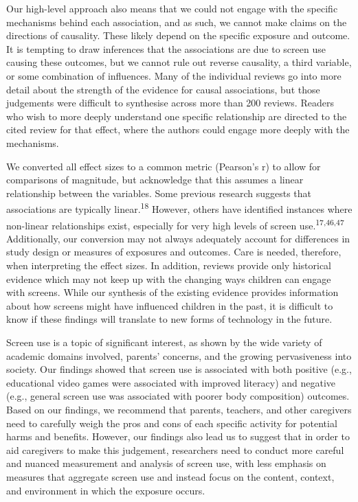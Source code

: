 \documentclass[
  english,
  man]{apa6}
\begin{document}
Our high-level approach also means that we could not engage with the specific mechanisms behind each association, and as such, we cannot make claims on the directions of causality.
These likely depend on the specific exposure and outcome.
It is tempting to draw inferences that the associations are due to screen use causing these outcomes, but we cannot rule out reverse causality, a third variable, or some combination of influences.
Many of the individual reviews go into more detail about the strength of the evidence for causal associations, but those judgements were difficult to synthesise across more than 200 reviews.
Readers who wish to more deeply understand one specific relationship are directed to the cited review for that effect, where the authors could engage more deeply with the mechanisms.

We converted all effect sizes to a common metric (Pearson's r) to allow for comparisons of magnitude, but acknowledge that this assumes a linear relationship between the variables.
Some previous research suggests that associations are typically linear.\textsuperscript{18}
However, others have identified instances where non-linear relationships exist, especially for very high levels of screen use.\textsuperscript{17,46,47}
Additionally, our conversion may not always adequately account for differences in study design or measures of exposures and outcomes.
Care is needed, therefore, when interpreting the effect sizes.
In addition, reviews provide only historical evidence which may not keep up with the changing ways children can engage with screens.
While our synthesis of the existing evidence provides information about how screens might have influenced children in the past, it is difficult to know if these findings will translate to new forms of technology in the future.

Screen use is a topic of significant interest, as shown by the wide variety of academic domains involved, parents' concerns, and the growing pervasiveness into society.
Our findings showed that screen use is associated with both positive (e.g., educational video games were associated with improved literacy) and negative (e.g., general screen use was associated with poorer body composition) outcomes.
Based on our findings, we recommend that parents, teachers, and other caregivers need to carefully weigh the pros and cons of each specific activity for potential harms and benefits.
However, our findings also lead us to suggest that in order to aid caregivers to make this judgement, researchers need to conduct more careful and nuanced measurement and analysis of screen use, with less emphasis on measures that aggregate screen use and instead focus on the content, context, and environment in which the exposure occurs.
\end{document}
